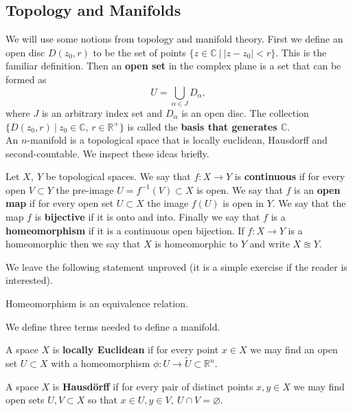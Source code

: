 \documentclass[11pt,oneside,final]{article}
\begin{document}

\subsection{Topology and Manifolds} We will use some notions from topology
and manifold theory. First we define an open disc \(D(z_0, r)\) to be the
set of points \(\{z \in \mathbb C\ |\ |z - z_0| < r\}\). This is the familiar
definition. Then an \textbf{open set} in the complex plane is a set that can
be formed as
\[U = \bigcup_{\alpha\in J}D_\alpha,\]
where \(J\) is an arbitrary index set and \(D_\alpha\) is an open disc. The 
collection \(\{D(z_0, r)\ |\ z_0 \in \mathbb C,\, r \in \mathbb R^+\}\) is
called the \textbf{basis that generates \(\mathbb C\)}. \\

An \(n\)-manifold is a topological space that is locally euclidean, Hausdorff
and second-countable. We inspect these ideas briefly.


\begin{dfn} Let \(X,\ Y\) be topological spaces. We say that \(f: X \rightarrow
	Y\) is \textbf{continuous} if for every open \(V \subset Y\) the pre-image \(U =
	f^{-1}(V) \subset X\) is open. We say that \(f\) is an \textbf{open map} if
	for every open set \(U \subset X\) the image \(f(U)\) is open in \(Y\). We 
	say that the map \(f\) is \textbf{bijective} if it is onto and into.
	Finally we say that \(f\) is a \textbf{homeomorphism} if it is a continuous 
	open bijection. If \(f: X \rightarrow Y\) is a homeomorphic then we say 
	that \(X\) is homeomorphic to \(Y\) and write \(X \approxeq Y\). 
\end{dfn}
We leave the following statement unproved (it is a simple exercise if the
reader is interested).
\begin{thm} Homeomorphism is an equivalence relation. \end{thm}

We define three terms needed to define a manifold.
\begin{dfn} A space \(X\) is \textbf{locally Euclidean} 
if for every point \(x \in X\) we may find an open set \(U \subset X\) with 
a homeomorphism \(\phi: U \rightarrow \tilde{U} \subset \mathbb R^n\).
\end{dfn}

\begin{dfn} A space \(X\) is \textbf{Hausd\"orff} if for every pair of distinct
points \(x,y \in X\) we may find open sets \(U, V \subset X\) so that \(x \in
U, y \in V,\ U\cap V = \varnothing\).  

\end{dfn}
\end{document}
